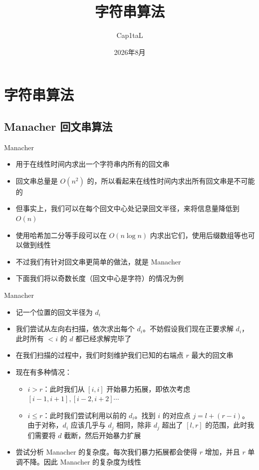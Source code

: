 ﻿\documentclass[aspectratio=169]{ctexbeamer}
\author{Cap1taL}
\title{字符串算法}
\date{2026年8月}
\begin{document}
\kaishu

\begin{frame}
    \titlepage
\end{frame}



\section{字符串算法}

\subsection{Manacher 回文串算法}
\begin{frame}{Manacher}
    \begin{itemize}
        \item 用于在线性时间内求出一个字符串内所有的回文串
        \item 回文串总量是 $O(n^2)$ 的，所以看起来在线性时间内求出所有回文串是不可能的
        \item 但事实上，我们可以在每个回文中心处记录回文半径，来将信息量降低到 $O(n)$
        \item 使用哈希加二分等手段可以在 $O(n\log n)$ 内求出它们，使用后缀数组等也可以做到线性
        \item 不过我们有针对回文串更简单的做法，就是 Manacher
        \item 下面我们将以奇数长度（回文中心是字符）的情况为例
    \end{itemize}
\end{frame}

\begin{frame}{Manacher}
    \begin{itemize}
        \item 记一个位置的回文半径为 $d_i$
        \item 我们尝试从左向右扫描，依次求出每个 $d_i$。不妨假设我们现在正要求解 $d_i$，此时所有 $<i$ 的 $d$ 都已经求解完毕了
        \item 在我们扫描的过程中，我们时刻维护我们已知的右端点 $r$ 最大的回文串
        \item 现在有多种情况：
        \begin{itemize}
            \item $i>r$：此时我们从 $[i,i]$ 开始暴力拓展，即依次考虑 $[i-1,i+1],[i-2,i+2]\cdots$
            \item $i\le r$：此时我们尝试利用以前的 $d_i$。找到 $i$ 的对应点 $j=l+(r-i)$。由于对称，$d_i$ 应该几乎与 $d_j$ 相同，除非 $d_j$ 超出了 $[l,r]$ 的范围，此时我们需要将 $d$ 截断，然后开始暴力扩展
        \end{itemize}
        \item 尝试分析 Manacher 的复杂度。每次我们暴力拓展都会使得 $r$ 增加，并且 $r$ 单调不降。因此 Manacher 的复杂度为线性
    \end{itemize}
\end{frame}
\end{document}
